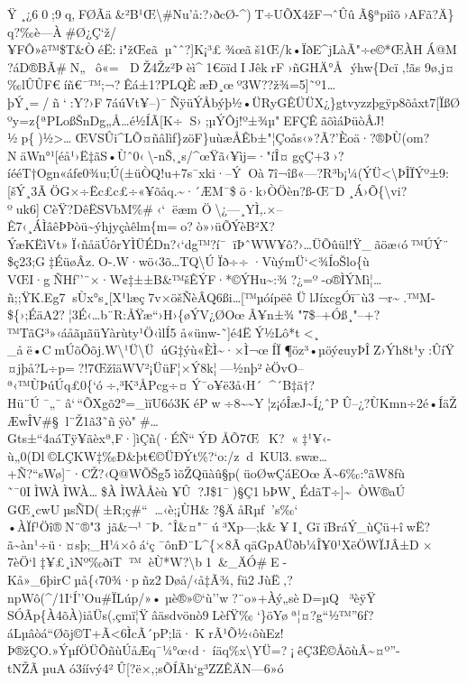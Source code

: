 Ÿ¸¿60;9q,FØÃä\&²B¹Œ\textbackslash\# Nu' å:?›ðcØ-\^{})T÷UÕX4žF¬ˆÛûÃ§ªpiîõ›AFã?Ä\}
q?‰è---À\#Ø¿Ç`ž/
¥FÔ»ê™\$T\&ÒéË:i"žŒ¢ãµ˜ˆ?{]}K¡³£¾œã\textquotesingle š1Œ/k\textbar•ÏðE\^{}jLàÃ"÷e©*ŒÀHÁ@M?áD®BÃ\#N„~ô«=
DŽ 4Žz²Þèì\^{}1€öïdIJêkrF›ñGHÄ°Å ýhw\{Dcï ‚!ãs
9ø,j¤‰lÛÛ­F€íñ€¯™;¬?Êá±1?P LQÈæÐ¸œº3W??ž¾=5{]}˜º1\ldots þÝ¸=/ñ`:Y?›F7áúVt¥--)¯ÑÿüÝÅbýþ½•ÜRyGÊÜÜX¿\}gtvyzzþgÿp8õåxt7{[}ÏßØºy\textquotesingle=z\{ªPLoßŠnDg„Å\ldots é½ÍÃ{[}K÷S›;µÝÔj\textbar!º±¾µ"EFÇÊãõìáÞüòÂJ!½p\{)½\textgreater\ldotsŒVSÛi\^{}LÕ¤ñâlìf\}zöF\}uùæ­ÅÊb±"¦Çoås‹»?Ã?'Èoä·?®ÞÙ(o­m?NäWn°¹{[}éå¹›Ë‡ãS•Ùˆ0‹\textbackslash-nŠ‚¸s/\^{}œŸã‹¥ìj\textbar=·"íÎ¤gçÇ+3›?íééT†Ogn\textquotesingle«áf¢0¾u;Ú(±üÒQ!u+7s¯xki·--ÝOà7î¬îß«---?R³b¡¼(ÝÜ\textless\textbackslash­ÞÎÏÝº±9:{[}šÝ¸3ÃÖG×÷Ëc£c£÷«¥õåq.\textasciitilde·´ÆM¯\$ö·k›ÒÖèn?ß-Œ¯D¸Á›Õ\{\textbackslash vi?ºuk6{]}CèŸ?DêËSVbM\%\#‹`ëæm
Ö\textbackslash¿---¸YÌ,.×--Ê7‹¸ÁÌâêÞÞòü\textasciitilde ýhjyçàêlm\{m=o?­ò»›üÕÝèB­²X?ÝæKËìVt»Ï‹ñåäÚôrYÌÜÉDn?\textquotesingle‹`\textbar dg™?í¯ïÞˆWW¥ô?›\ldots ÜÕûül!Ÿ\_ãöæ‹ó™ÚÝ¨
\$ç23;G‡ÉüøÂz.O-.W·wö‹3õ\ldots TQ\textbackslash ÚÏð÷÷·VùýmÜ`\textless¾ÍoŠl\textbar o\{ù
VŒI·gÑHf­''¨×·W¢‡±±B\&™šÊÝF·*©ÝHu\textasciitilde:¾?¿=º-o®ÌÝMì¦\ldots ñ;;ŸK.Eg7sÙx°s¸{[}X¹læç7v×öšÑèÂQ6ßi\ldots{[}™µóípëê
ÜlJíxcgÓï¯ù3¬r\textasciitilde\textbar.™M­\$\{›;ÉäA2?¦3É‹\ldots b¨R:ÅŸæ``›H›\{øÝV¿ØOœÂ¥n±¾"7\$--+Óß¸"--+?™TãG³»‹áåãµãüYàrùty¹Ö‹ìlÍ5
å«ünw-˜{]}é4ËÝ½Lô*t\textless¸
\_åë•CmÚõÕõj.W\textbackslash¹Ü\textbackslash ÜúG‡ýù«ÈÌ\textasciitilde·×Ì¬œÍÏ¶öz³•µö\textbar ý¢uyÞÎZ›Ýh8t¹y:ÛíŸ¤jþå?L÷p=?!7ŒžîäWV²¡ÜüF¦×Ý8k¦---½nþ²èÖvO--ª‹™ÙÞúÚq£0\{`ó÷‚³K³ÅPcg÷¤Ý¯o¥ë3å‹H´\^{}´B‡ä†?Hü¨Ú¯„¯â`\,``ÕXgõ2°=\_ìïU6ó3KéPw÷8\textasciitilde\textasciitilde Y¦z¡óÎæJ\textasciitilde Í¿ˆPÛ--¿?ÙKmn÷2é•ÍäŽ 
ÆwÎV\#§l¨Ž1ã3˜ñÿò"\#\ldots Gts±``4aáTÿ¥ãèxª‚F·{]}ìÇñ(·ÉÑ``ÝÐÅÕ7Œ~K?«‡¹¥‹­ù„0(Dl©LÇKW‡‰Ð\&þt€©ÜÐÝt\%?{}`o:/zd~KUl3.swæ\ldots+Ñ?{}``sWø{]}¯·CŽ?‹Q@W­ÕŠg5ìõŽQüàû§p(üoØwÇáEOœÄ\textasciitilde6‰:°ãW8ƒù
˜¯0IÌWÀ\textbarÌWÀ\textbar\ldots\$À\textbarÌWÀ\textbar Åèù
¥Û?J\$1¯)§Ç1bÞW¸ÉdãT÷{]}\textasciitildeÒW®aÚ
GŒ¸cwU­µsÑD(±R;ç\#``\ldots‹è;¡ÙH\&?§ÄåRµƒ's‰`
•ÀÏf¹Öî®N¨®"3jã\&¬¹¯Þ.ˆÎ\&¤"¯ú³Xp---;k\&¥I¸Gï
ïBráÝ\_ùÇü+îwË?ã\textasciitilde àn¹÷ü·¤sþ;\_H¼×ôá`ç¯ônÐ¨L\^{}\{×8ÃqäGpAÜðb¼Î¥0¹XëÖWÏJÂ±D×
7èÖ`l
‡¥£¸ìNº‰ðiT™èÙ*W?\textbar\textbackslash b1~\&\_ÄÓ\#E-Kå»\_6þirCµå\{‹70¾·pñz2Døå/‹å‡Ã¾,ƒü2JùË‚?npWô(\^{}/1I`Í''Ou\#ÏLúp/\textquotesingle»•µè®»©`ù''w?¨o»+Àý„sèD\textbar=µQ³èÿŸ
SÓÃp\{À4õÀ)iåÜs(‚çmï¦Ÿâäsdvönò9LèfŸ‰`\}öYøª¦¤?g``½™''6f?áLµâòá``Øõj©T+Ã\textless6ÌcÃ´pP;lä·KrÃ¹Õ½‹ôùEz!Þ®žÇO.»ÝµƒÖÜÕñùÚåÆq¯¼°œ‹d·íäq\%x\textbackslash YÜ=?¡êÇ3Ë©ÅõùÂ\textasciitilde¤º''-tNŽÃµuAó3íívý4²Û{[}?ë×‚;sÕÍÃ­h`g³ZZÊÄN---6»ó
